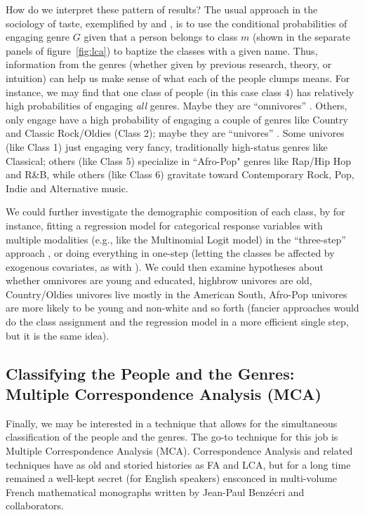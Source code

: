 How do we interpret these pattern of results? The usual approach in the sociology of taste, exemplified by \citet{chan_goldthorpe07} and \citet{tampubolon2008revisiting}, is to use the conditional probabilities of engaging genre $G$ given that a person belongs to class $m$ (shown in the separate panels of figure~\ref{fig:lca}) to baptize the classes with a given name. Thus, information from the genres (whether given by previous research, theory, or intuition) can help us make sense of what each of the people clumps means. For instance, we may find that one class of people (in this case class 4) has relatively high probabilities of engaging {\em all} genres. Maybe they are ``omnivores'' \citep{peterson_kern96}. Others, only engage have a high probability of engaging a couple of genres like Country and Classic Rock/Oldies (Class 2); maybe they are ``univores'' \citep{peterson92}. Some univores (like Class 1) just engaging very fancy, traditionally high-status genres like Classical; others (like Class 5) specialize in ``Afro-Pop" genres like Rap/Hip Hop and R\&B, while others (like Class 6) gravitate toward Contemporary Rock, Pop, Indie and Alternative music. 

We could further investigate the demographic composition of each class, by for instance, fitting a regression model for categorical response variables with multiple modalities (e.g., like the Multinomial Logit model) in the ``three-step'' approach \citep{bakk2013estimating}, or doing everything in one-step (letting the classes be affected by exogenous covariates, as with \citet{tampubolon2008revisiting}). We could then examine hypotheses about whether omnivores are young and educated, highbrow univores are old, Country/Oldies univores live mostly in the American South, Afro-Pop univores are more likely to be young and non-white and so forth (fancier approaches would do the class assignment and the regression model in a more efficient single step, but it is the same idea). 

\subsection{Classifying the People and the Genres: Multiple Correspondence Analysis (MCA)}
Finally, we may be interested in a technique that allows for the simultaneous classification of the people and the genres. The go-to technique for this job is Multiple Correspondence Analysis (MCA). Correspondence Analysis and related techniques have as old and storied histories as FA and LCA, but for a long time remained a well-kept secret (for English speakers) ensconced in multi-volume French mathematical monographs written by Jean-Paul Benz\'{e}cri and collaborators. 

